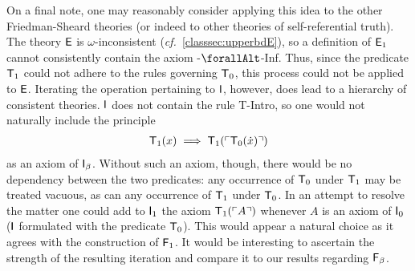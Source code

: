 \documentclass[UKenglish,cleveref,DIV=12]{scrartcl}
\let\forall\forallAlt
\theoremstyle{definition}
\theoremstyle{definition}
\begin{document}
 On a final note, one may
reasonably consider applying this idea to the other Friedman-Sheard
theories (or indeed to other theories of self-referential truth). The
theory $\mathsf{E}$ is $\omega$-inconsistent ({\em cf.}~\cref{classsec:upperbdE}),
so a definition of $\mathsf{E}_1$ cannot consistently contain the axiom
-$\forall$-Inf. Thus, since the predicate $\mathsf{T}_1$ could not adhere to the
rules governing $\mathsf{T}_0$, this process could not be applied to $\mathsf{E}$. Iterating the
operation pertaining to $\mathsf{I}$, however, does lead to a hierarchy of consistent
theories. $\mathsf{I}$ does not contain the rule T-Intro, so one would not naturally include the principle
\begin{align*}
  \mathsf{T}_1(x)\implies \mathsf{T}_1(\ulcorner{\mathsf{T}_0(\dot x)}\urcorner)
\end{align*}
as an axiom of $\mathsf{I}_\beta$. Without such an axiom, though, there would be no dependency between the two
predicates: any occurrence of $\mathsf{T}_0$ under $\mathsf{T}_1$ may be treated vacuous, as can
any occurrence of $\mathsf{T}_1$ under $\mathsf{T}_0$. In an attempt to resolve the matter one
could add to $\mathsf{I}_1$ the axiom $\mathsf{T}_1(\ulcorner{A}\urcorner)$ whenever $A$ is an axiom of $\mathsf{I}_0$
($\mathsf{I}$ formulated with the predicate $\mathsf{T}_0$). This would appear a natural choice
as it agrees with the construction of $\mathsf{F}_1$.
It would be interesting to ascertain the strength of the resulting
iteration and compare it to our results regarding $\mathsf{F}_\beta$.

\end{document}
